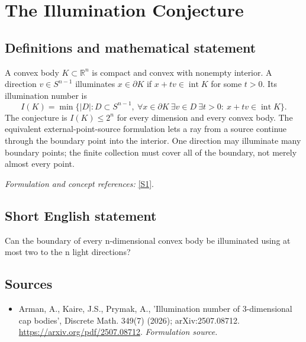 \documentclass[11pt]{article}
\begin{document}
\section*{\texorpdfstring{The Illumination Conjecture}{The Illumination Conjecture}}\label{1123}
\subsection{Definitions and mathematical statement}
A convex body $K\subset{\mathbb{R}}^n$ is compact and convex with nonempty interior. A direction $v\in S^{n-1}$ illuminates $x\in\partial K$ if $x+tv\in\operatorname{int}K$ for some $t>0$. Its illumination number is
\[
 I(K)=\min\{|D|:D\subset S^{n-1},\
 \forall x\in\partial K\ \exists v\in D\ \exists t>0:\
 x+tv\in\operatorname{int}K\}.
\]
The conjecture is $I(K)\le2^n$ for every dimension and every convex body. The equivalent external-point-source formulation lets a ray from a source continue through the boundary point into the interior. One direction may illuminate many boundary points; the finite collection must cover all of the boundary, not merely almost every point.
\par\smallskip\textit{Formulation and concept references:} \href{https://arxiv.org/pdf/2507.08712}{[S1]}.

\subsection{Short English statement}
Can the boundary of every n-dimensional convex body be illuminated using at most two to the n light directions?
\subsection{Sources}
\begin{itemize}
\item[S1]Arman, A., Kaire, J.S., Prymak, A., 'Illumination number of 3-dimensional cap bodies', Discrete Math. 349(7) (2026); arXiv:2507.08712.
\url{https://arxiv.org/pdf/2507.08712}.
\textit{Formulation source.}
\end{itemize}
\end{document}
